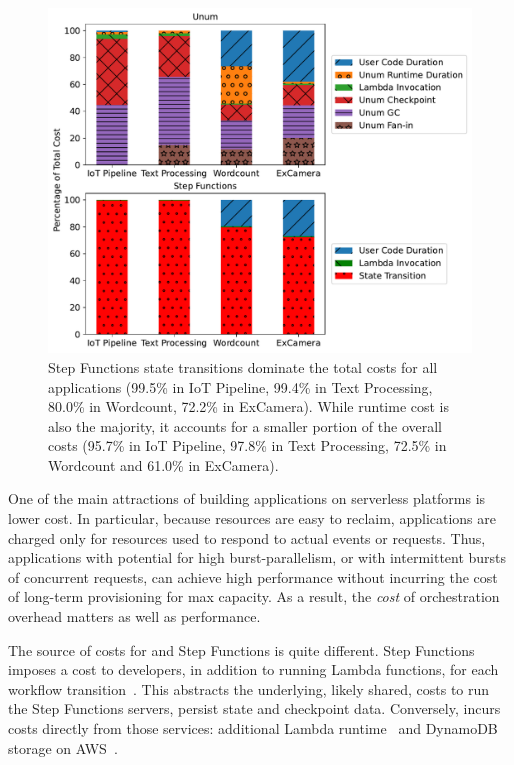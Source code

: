 \begin{figure}[t!]
    \centering
    \includegraphics[width=\columnwidth]{figures/AppCostBreakdown.pdf}
    \caption{Step Functions state transitions dominate the total costs for all
    applications (99.5\% in IoT Pipeline, 99.4\% in Text Processing, 80.0\% in
    Wordcount, 72.2\% in ExCamera). While \name{} runtime cost is also the
    majority, it accounts for a smaller portion of the overall costs (95.7\%
    in IoT Pipeline, 97.8\% in Text Processing, 72.5\%
    in Wordcount and 61.0\% in ExCamera).}
    \label{fig:cost-breakdown}
\end{figure}

One of the main attractions of building applications on serverless platforms
is lower cost. In particular, because resources are easy to reclaim,
applications are charged only for resources used to respond to actual events
or requests. Thus, applications with potential for high burst-parallelism, or
with intermittent bursts of concurrent requests, can achieve high performance
without incurring the cost of long-term provisioning for max capacity. As a
result, the \emph{cost} of orchestration overhead matters as well as
performance.

The source of costs for \name{} and Step Functions is quite different. Step
Functions imposes a cost to developers, in addition to running Lambda
functions, for each workflow transition~\cite{aws-step-functions-pricing}.
This abstracts the underlying, likely shared, costs to run the Step Functions
servers, persist state and checkpoint data. Conversely, \name{} incurs costs
directly from those services: additional Lambda
runtime~\cite{aws-lambda-pricing} and DynamoDB storage on
AWS~\cite{dynamodb-pricing}.

